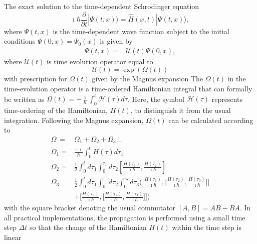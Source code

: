 \documentclass[journal=jctcce,manuscript=article,etalmode=truncate,maxauthors=10,layout=twocolumn,9pt]{achemso}   %
\begin{document}
The exact solution  to
 the time-dependent Schrodinger equation
\begin{equation}
\imath \hbar \frac{\partial}{\partial t} | \Psi(t,x) \rangle  =  \hat H(x,t)  |\Psi(t,x) \rangle,
\end{equation}
where $\Psi(t,x)$  is  the time-dependent wave function  
subject to the initial conditions $\Psi(0,x)=\Psi_0(x)$  %
is given by 
\begin{align}
 \Psi(t,x)  =&  {\mathcal U}(t) \Psi(0,x),  %
\end{align}
where  ${\mathcal U}(t) $ is  time evolution  operator equal  to
\begin{equation}
 {\mathcal U}(t)  = \exp( \Omega(t))
\label{eq:U_operator}
\end{equation}
with prescription for $\Omega(t)$ given by the Magnus expansion \cite{Magnus-1954,Oteo-2000,Casas-2007,lvnmd} %
The $\Omega(t)$ in the time-evolution operator is a time-ordered  Hamiltonian integral  that can 
formally be written as $\Omega(t)=-\frac{\imath}{\hbar} \int_0^t \mathcal H(\tau)d\tau$. 
Here, the symbol $\mathcal H(\tau)$ represents time-ordering of the Hamiltonian, $H(t)$,
 to distinguish it from the  usual integration.
Following the Magnus expansion,  $\Omega(t)$ can be calculated according to 
\begin{align} 
\Omega_{~}   = &  \Omega_1 +  \Omega_2 +  \Omega_3 \ldots  \label{eq:omega} \\
\Omega_1 = & \frac{-\imath}{\hbar} \int_0^t  H(\tau) d\tau_1  \label{eq:omega1}  \\
\Omega_2 = & \frac{1}{2}  \int_0^t d\tau_1 \int_0^{\tau_1} d\tau_2   
  \left[\frac{ H(\tau_1)}{\imath \hbar}, \frac{ H(\tau_2)}{\imath \hbar}\right] \label{eq:omega2} \\
 \nonumber \Omega_3 = &  \frac{1}{2}  \int_0^t d\tau_1 \int_0^{\tau_1} d\tau_2 \int_0^{\tau_2} d\tau_3 
  \Big(\Big[\frac{ H(\tau_1)}{\imath \hbar}, \big[ \frac{ H(\tau_2)}{\imath \hbar},\frac{ H(\tau_3)}{\imath \hbar}\big] \Big]    \\
 & + \Big[\frac{H(\tau_3)}{\imath \hbar}, \big[\frac{ H(\tau_2)}{\imath \hbar},\frac{ H(\tau_1)}{\imath \hbar}\big] \Big] \Big)    \label{eq:omega3}
\end{align} 
with the square bracket denoting the usual commutator $[A,B]=AB-BA$.
In all practical implementations, the propagation is performed using a small  time  step $\Delta t$  
so that the change of the Hamiltonian $H(t)$  within the time step is linear
\end{document}
